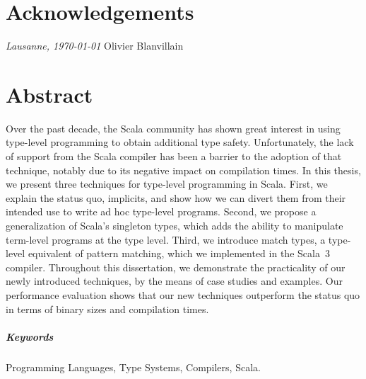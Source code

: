 



\frontmatter

\setcounter{page}{0}

\chapter{Acknowledgements}



\bigskip
\noindent\textit{Lausanne, \today}
\hfill Olivier Blanvillain

\cleardoublepage
\chapter*{Abstract} %

Over the past decade, the Scala community has shown great interest in using type-level programming to obtain additional type safety.
Unfortunately, the lack of support from the Scala compiler has been a barrier to the adoption of that technique, notably due to its negative impact on compilation times.
In this thesis, we present three techniques for type-level programming in Scala.
First, we explain the status quo, implicits, and show how we can divert them from their intended use to write ad hoc type-level programs.
Second, we propose a generalization of Scala's singleton types, which adds the ability to manipulate term-level programs at the type level.
Third, we introduce match types, a type-level equivalent of pattern matching, which we implemented in the Scala~3 compiler.
Throughout this dissertation, we demonstrate the practicality of our newly introduced techniques, by the means of case studies and examples.
Our performance evaluation shows that our new techniques outperform the status quo in terms of binary sizes and compilation times.

\paragraph{Keywords} Programming Languages, Type Systems, Compilers, Scala.

